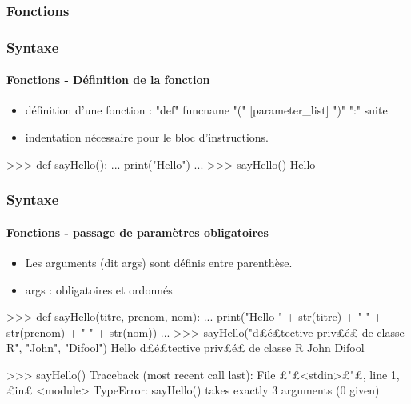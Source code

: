\subsubsection{Fonctions}
\begin{frame}[fragile]
\frametitle{Syntaxe}
\framesubtitle{Fonctions - Définition de la fonction}
\begin{itemize}
\item définition d'une fonction : "def" funcname "(" [parameter\_list] ")" ":" suite
\item indentation nécessaire pour le bloc d'instructions. 
\end{itemize}
\begin{pythonConsole}
>>> def sayHello(): 
...    print("Hello")
...
>>> sayHello()
Hello
\end{pythonConsole}
\end{frame}
\begin{frame}[fragile]
\frametitle{Syntaxe}
\framesubtitle{Fonctions - passage de paramètres obligatoires}
\begin{itemize}
\item Les arguments (dit args) sont définis entre parenthèse. 
\item args : obligatoires et ordonnés
\end{itemize}
\begin{pythonConsole}
>>> def sayHello(titre, prenom, nom): 
...    print("Hello " + str(titre) + " " + str(prenom) + " " + str(nom))
...
>>> sayHello("d£{\color{magenta}é}£tective priv£{\color{magenta}é}£ de classe R", "John", "Difool")
Hello d£é£tective priv£é£ de classe R John Difool
\end{pythonConsole}
\begin{pythonConsole}
>>> sayHello()
Traceback (most recent call last):
  File £"£<stdin>£"£, line 1, £in£ <module>
TypeError: sayHello() takes exactly 3 arguments (0 given)
\end{pythonConsole}
\end{frame}
